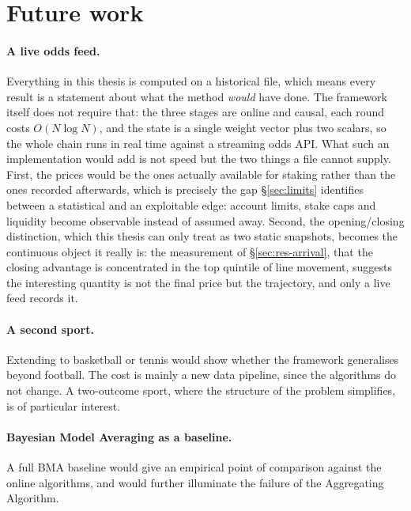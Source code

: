 \documentclass[12pt,a4paper,oneside]{report}
\renewcommand{\_}{\oldunderscore\allowbreak}
\theoremstyle{definition}
\theoremstyle{plain}
\theoremstyle{remark}
\begin{document}
\section{Future work}

\paragraph{A live odds feed.} Everything in this thesis is computed on a historical file, which
means every result is a statement about what the method \emph{would} have done. The framework
itself does not require that: the three stages are online and causal, each round costs
$O(N\log N)$, and the state is a single weight vector plus two scalars, so the whole chain runs in
real time against a streaming odds API. What such an implementation would add is not speed but the
two things a file cannot supply. First, the prices would be the ones actually available for
staking rather than the ones recorded afterwards, which is precisely the gap
\S\ref{sec:limits} identifies between a statistical and an exploitable edge: account limits,
stake caps and liquidity become observable instead of assumed away. Second, the opening/closing
distinction, which this thesis can only treat as two static snapshots, becomes the continuous
object it really is: the measurement of \S\ref{sec:res-arrival}, that the closing advantage is
concentrated in the top quintile of line movement, suggests the interesting quantity is not the
final price but the trajectory, and only a live feed records it.

\paragraph{A second sport.} Extending to basketball or tennis would show whether the framework
generalises beyond football. The cost is mainly a new data pipeline, since the algorithms do not
change. A two-outcome sport, where the structure of the problem simplifies, is of particular
interest.

\paragraph{Bayesian Model Averaging as a baseline.} A full BMA baseline would give an empirical
point of comparison against the online algorithms, and would further illuminate the failure of the
Aggregating Algorithm.

\appendix

\end{document}
